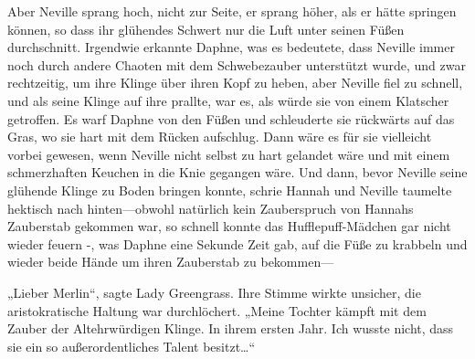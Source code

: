 Aber Neville sprang hoch, nicht zur Seite, er sprang höher, als er hätte springen können, so dass ihr glühendes Schwert nur die Luft unter seinen Füßen durchschnitt. Irgendwie erkannte Daphne, was es bedeutete, dass Neville immer noch durch andere Chaoten mit dem Schwebezauber unterstützt wurde, und zwar rechtzeitig, um ihre Klinge über ihren Kopf zu heben, aber Neville fiel zu schnell, und als seine Klinge auf ihre prallte, war es, als würde sie von einem Klatscher getroffen. Es warf Daphne von den Füßen und schleuderte sie rückwärts auf das Gras, wo sie hart mit dem Rücken aufschlug. Dann wäre es für sie vielleicht vorbei gewesen, wenn Neville nicht selbst zu hart gelandet wäre und mit einem schmerzhaften Keuchen in die Knie gegangen wäre. Und dann, bevor Neville seine glühende Klinge zu Boden bringen konnte, schrie Hannah  und Neville taumelte hektisch nach hinten—obwohl natürlich kein Zauberspruch von Hannahs Zauberstab gekommen war, so schnell konnte das Hufflepuff-Mädchen gar nicht wieder feuern -, was Daphne eine Sekunde Zeit gab, auf die Füße zu krabbeln und wieder beide Hände um ihren Zauberstab zu bekommen—

\later

„Lieber Merlin“, sagte Lady Greengrass. Ihre Stimme wirkte unsicher, die aristokratische Haltung war durchlöchert. „Meine Tochter kämpft mit dem Zauber der Altehrwürdigen Klinge. In ihrem ersten Jahr. Ich wusste nicht, dass sie ein so außerordentliches Talent besitzt…“

